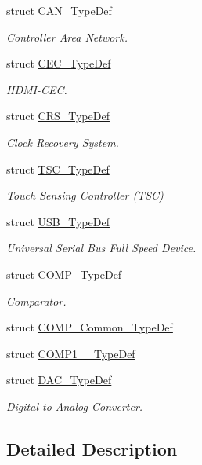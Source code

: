 \begin{DoxyCompactItemize}
struct \hyperlink{struct_c_a_n___type_def}{C\+A\+N\+\_\+\+Type\+Def}
\begin{DoxyCompactList}\small\item\em Controller Area Network. \end{DoxyCompactList}\item 
struct \hyperlink{struct_c_e_c___type_def}{C\+E\+C\+\_\+\+Type\+Def}
\begin{DoxyCompactList}\small\item\em H\+D\+M\+I-\/\+C\+EC. \end{DoxyCompactList}\item 
struct \hyperlink{struct_c_r_s___type_def}{C\+R\+S\+\_\+\+Type\+Def}
\begin{DoxyCompactList}\small\item\em Clock Recovery System. \end{DoxyCompactList}\item 
struct \hyperlink{struct_t_s_c___type_def}{T\+S\+C\+\_\+\+Type\+Def}
\begin{DoxyCompactList}\small\item\em Touch Sensing Controller (T\+SC) \end{DoxyCompactList}\item 
struct \hyperlink{struct_u_s_b___type_def}{U\+S\+B\+\_\+\+Type\+Def}
\begin{DoxyCompactList}\small\item\em Universal Serial Bus Full Speed Device. \end{DoxyCompactList}\item 
struct \hyperlink{struct_c_o_m_p___type_def}{C\+O\+M\+P\+\_\+\+Type\+Def}
\begin{DoxyCompactList}\small\item\em Comparator. \end{DoxyCompactList}\item 
struct \hyperlink{struct_c_o_m_p___common___type_def}{C\+O\+M\+P\+\_\+\+Common\+\_\+\+Type\+Def}
\item 
struct \hyperlink{struct_c_o_m_p1__2___type_def}{C\+O\+M\+P1\+\_\+\_\+\+Type\+Def}
\item 
struct \hyperlink{struct_d_a_c___type_def}{D\+A\+C\+\_\+\+Type\+Def}
\begin{DoxyCompactList}\small\item\em Digital to Analog Converter. \end{DoxyCompactList}\end{DoxyCompactItemize}


\subsection{Detailed Description}
